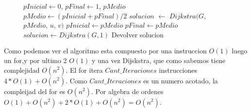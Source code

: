 \begin{center}
 \begin{figure}[H]
  \begin{pseudo}
    \State $pInicial \leftarrow 0$, $pFinal \leftarrow 1$, $pMedio$ 
      \State $pMedio \leftarrow (pInicial + pFinal)/2$ 
      \State $solucion$ $\leftarrow$ $Dijkstra(G$, $pMedio$, $u$, $v)$ 
       
	 \State $pInicial \leftarrow pMedio$ 
      \Else
	 \State $pFinal \leftarrow pMedio$ 
      \EndIf
    \EndFor
     
      \State $solucion \leftarrow Dijkstra(G, 1)$ 
    \EndIf
    \State Devolver solucion 
   \EndProcedure
  \end{pseudo}
 \end{figure}
\end{center}

 Como podemos ver el algoritmo esta compuesto por una instruccion $O(1)$ luego un for,y por ultimo 2 $O(1)$ y una vez Dijskstra, que como sabemos tiene complejidad $O(n^2)$. El for itera $Cant\_Iteraciones$ instrucciones $4*O(1) + O(n^2)$. Como $Cant\_Iteraciones$ es un numero acotado, la compleijad del for es $O(n^2)$. Por algebra de ordenes $O(1)+O(n^2)+2*O(1)+O(n^2)=O(n^2)$.  